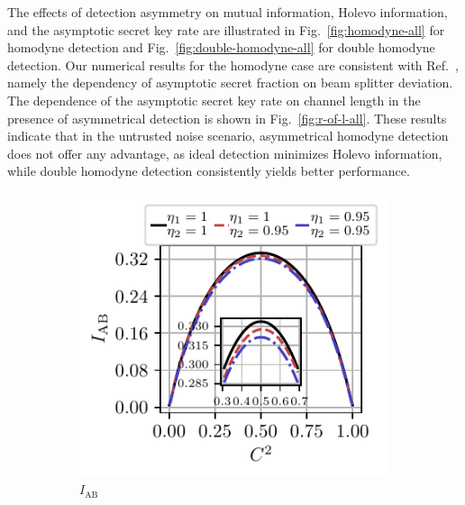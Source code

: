 \documentclass[%
reprint,
superscriptaddress,
 amsmath,amssymb,amsfonts,
 aps,
 pra,
 longbibliography
]{revtex4-2}
\newcommand{\ind}[1]{\mathrm{#1}}
\begin{document}
The effects of detection asymmetry on mutual information, Holevo information, and the asymptotic secret key rate are illustrated in Fig.~\ref{fig:homodyne-all} for homodyne detection and Fig.~\ref{fig:double-homodyne-all} for double homodyne detection. Our numerical results for the homodyne case are consistent 
with Ref.~\cite{ruiz2023effects}, namely the dependency of asymptotic secret fraction on beam splitter deviation. The dependence of the asymptotic secret key rate on channel length in the presence of asymmetrical detection is shown in Fig.~\ref{fig:r-of-l-all}. These results indicate that in the untrusted noise scenario, asymmetrical homodyne detection does not offer any advantage, as ideal detection minimizes Holevo information, while double homodyne detection consistently yields better performance.

\begin{figure}
    \centering
    \begin{subfigure}[c]{.3\linewidth}
\includegraphics[width=\linewidth, trim={.2cm .3cm .4cm .35cm},clip]{pics/qkd/hom/IAB.pdf}
\caption[]{$I_{\ind{AB}}$}
        \end{subfigure}
\hfill
        \begin{subfigure}[c]{.3\linewidth}

\end{subfigure}
\end{figure}
\end{document}
